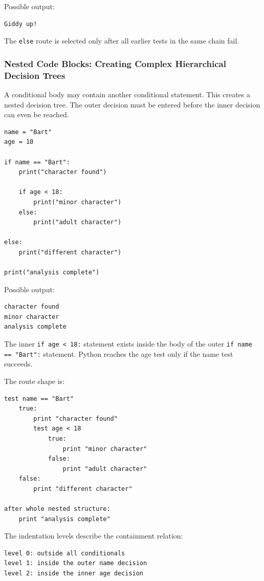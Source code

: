 Possible output:

\begin{verbatim}
Giddy up!
\end{verbatim}

The \texttt{else} route is selected only after all earlier tests in the same chain fail.

\subsubsection{Nested Code Blocks: Creating Complex Hierarchical Decision Trees}

A conditional body may contain another conditional statement. This creates a nested decision tree. The outer decision must be entered before the inner decision can even be reached.

\begin{verbatim}
name = "Bart"
age = 10

if name == "Bart":
    print("character found")

    if age < 18:
        print("minor character")
    else:
        print("adult character")

else:
    print("different character")

print("analysis complete")
\end{verbatim}

Possible output:

\begin{verbatim}
character found
minor character
analysis complete
\end{verbatim}

The inner \texttt{if age < 18:} statement exists inside the body of the outer \texttt{if name == "Bart":} statement. Python reaches the age test only if the name test succeeds.

The route shape is:

\begin{verbatim}
test name == "Bart"
    true:
        print "character found"
        test age < 18
            true:
                print "minor character"
            false:
                print "adult character"
    false:
        print "different character"

after whole nested structure:
    print "analysis complete"
\end{verbatim}

The indentation levels describe the containment relation:

\begin{verbatim}
level 0: outside all conditionals
level 1: inside the outer name decision
level 2: inside the inner age decision
\end{verbatim}

